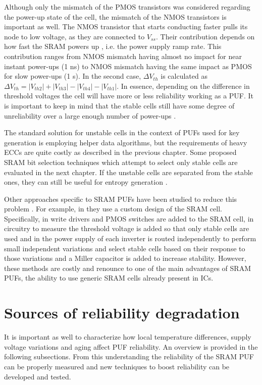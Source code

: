Although only the mismatch of the PMOS transistors was considered regarding the power-up state of the cell, the mismatch of the NMOS transistors is important as well. The NMOS transistor that starts conducting faster pulls its node to low voltage, as they are connected to $V_{ss}$. Their contribution depends on how fast the SRAM powers up \cite{Wang2018}, i.e. the power supply ramp rate. This contribution ranges from NMOS mismatch having almost no impact for near instant power-ups (1 ns) to NMOS mismatch having the same impact as PMOS for slow power-ups (1 s). In the second case, $\Delta V_{th}$ is calculated as $\Delta V_{th}=|V_{th2}|+|V_{th3}|-|V_{th4}|-|V_{th1}|$. 
In essence, depending on the difference in threshold voltages the cell will have more or less reliability working as a PUF. It is important to keep in mind that the stable cells still have some degree of unreliability over a large enough number of power-ups \cite{Liu2017}.

The standard solution for unstable cells in the context of PUFs used for key generation is employing helper data algorithms, but the requirements of heavy ECCs are quite costly as described in the previous chapter. Some proposed SRAM bit selection techniques which attempt to select only stable cells are evaluated in the next chapter. If the unstable cells are separated from the stable ones, they can still be useful for entropy generation \cite{Baturone2015}. 

Other approaches specific to SRAM PUFs have been studied to reduce this problem \cite{Baturone2015}. For example, in \cite{Okumura2011,Hofer2010,Shifman2018} they use a custom design of the SRAM cell. Specifically, in \cite{Okumura2011} write drivers and PMOS switches are added to the SRAM cell, in \cite{Hofer2010} circuitry to measure the threshold voltage is added so that only stable cells are used and in \cite{Shifman2018} the power supply of each inverter is routed independently to perform small independent variations and select stable cells based on their response to those variations and a Miller capacitor is added to increase stability. However, these methods are costly and renounce to one of the main advantages of SRAM PUFs, the ability to use generic SRAM cells already present in ICs. 

\section{Sources of reliability degradation}

It is important as well to characterize how local temperature differences, supply voltage variations and aging affect PUF reliability. An overview is provided in the following subsections. From this understanding the reliability of the SRAM PUF can be properly measured and new techniques to boost reliability can be developed and tested.

